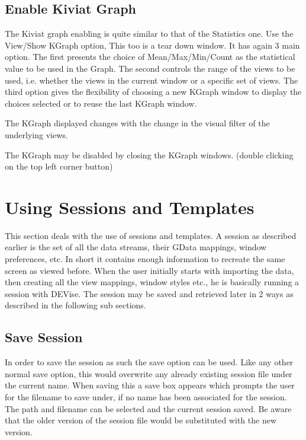 \subsection{Enable Kiviat Graph}

The Kiviat graph enabling is quite similar to that of the Statistics
one. Use the View/Show KGraph option, This too is a tear down
window. It has again 3 main option. The first presents the choice of
Mean/Max/Min/Count as the statistical value to be used in the
Graph. The second controls the range of the views to be used,
i.e. whether the views in the current window or a specific set of
views.  The third option gives the flexibility of choosing a new
KGraph window to display the choices selected or to reuse the last
KGraph window.

The KGraph displayed changes with the change in the visual filter of
the underlying views.

The KGraph may be disabled by closing the KGraph windows. (double
clicking on the top left corner button)

\section{Using Sessions and Templates}

This section deals with the use of sessions and templates. A session
as described earlier is the set of all the data streams, their GData
mappings, window preferences, etc. In short it contains enough
information to recreate the same screen as viewed before. When the
user initially starts with importing the data, then creating all the
view mappings, window styles etc., he is basically running a session
with DEVise. The session may be saved and retrieved later in 2 ways as
described in the following sub sections.

\subsection{Save Session}

In order to save the session as such the save option can be used. Like
any other normal save option, this would overwrite any already
existing session file under the current name. When saving this a save
box appears which prompts the user for the filename to save under, if
no name has been associated for the session. The path and filename can
be selected and the current session saved. Be aware that the older
version of the session file would be substituted with the new version.

